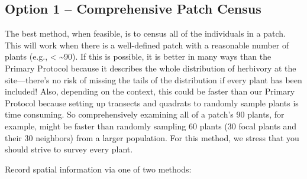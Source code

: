 \documentclass[
  letterpaper,
  DIV=11,
  numbers=noendperiod]{scrreprt}
\begin{document}
\subsection{Option 1 -- Comprehensive Patch
Census}\label{option-1-comprehensive-patch-census}

The best method, when feasible, is to census all of the individuals in a
patch. This will work when there is a well-defined patch with a
reasonable number of plants (e.g., \textless{} \textasciitilde90). If
this is possible, it is better in many ways than the Primary Protocol
because it describes the whole distribution of herbivory at the
site---there's no risk of missing the tails of the distribution if every
plant has been included! Also, depending on the context, this could be
faster than our Primary Protocol because setting up transects and
quadrats to randomly sample plants is time consuming. So comprehensively
examining all of a patch's 90 plants, for example, might be faster than
randomly sampling 60 plants (30 focal plants and their 30 neighbors)
from a larger population. For this method, we stress that you should
strive to survey every plant.

Record spatial information via one of two methods:
\end{document}
